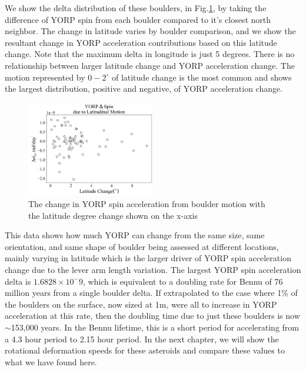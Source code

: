 We show the delta distribution of these boulders, in Fig.\ref{fig:motion_delta}, by taking the difference of YORP spin from each boulder compared to it's closest north neighbor. The change in latitude varies by boulder comparison, and we show the resultant change in YORP acceleration contributions based on this latitude change. Note that the maximum delta in longitude is just 5 degrees. There is no relationship between larger latitude change and YORP acceleration change. The motion represented by $0-2^{\circ}$ of latitude change is the most common and shows the largest distribution, positive and negative, of YORP acceleration change. 

\begin{figure}[H]
    \centering
    \includegraphics[width=0.5\textwidth]{fig/yorp_delta_boulder_motion_bennu.png}
    \caption{The change in YORP spin acceleration from boulder motion with the latitude degree change shown on the x-axis}
    \label{fig:motion_delta}
\end{figure}

This data shows how much YORP can change from the same size, same orientation, and same shape of boulder being assessed at different locations, mainly varying in latitude which is the larger driver of YORP spin acceleration change due to the lever arm length variation. The largest YORP spin acceleration delta is $1.6828\times 10^-9$, which is equivalent to a doubling rate for Bennu of 76 million years from a single boulder delta. If extrapolated to the case where 1\% of the boulders on the surface, now sized at 1m, were all to increase in YORP acceleration at this rate, then the doubling time due to just these boulders is now $\sim$153,000 years. In the Bennu lifetime, this is a short period for accelerating from a 4.3 hour period to 2.15 hour period. In the next chapter, we will show the rotational deformation speeds for these asteroids and compare these values to what we have found here.





